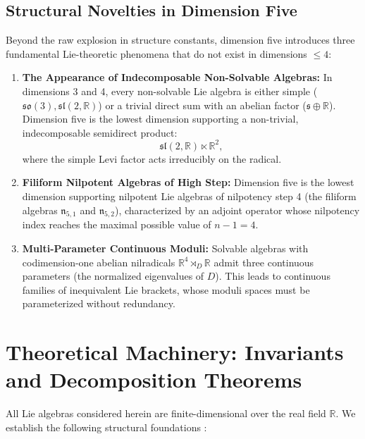 \documentclass[11pt,a4paper]{article}
\theoremstyle{definition}
\theoremstyle{remark}
\newcommand{\R}{\mathbb{R}}
\newcommand{\s}{\mathfrak{s}}
\begin{document}
\subsection{Structural Novelties in Dimension Five}
Beyond the raw explosion in structure constants, dimension five introduces three fundamental Lie-theoretic phenomena that do not exist in dimensions $\le 4$:
\begin{enumerate}
    \item \textbf{The Appearance of Indecomposable Non-Solvable Algebras:} In dimensions 3 and 4, every non-solvable Lie algebra is either simple ($\mathfrak{so}(3), \mathfrak{sl}(2,\R)$) or a trivial direct sum with an abelian factor ($\s \oplus \R$). Dimension five is the lowest dimension supporting a non-trivial, indecomposable semidirect product:
    \begin{equation}
        \mathfrak{sl}(2,\R) \ltimes \R^2,
    \end{equation}
    where the simple Levi factor acts irreducibly on the radical.
    \item \textbf{Filiform Nilpotent Algebras of High Step:} Dimension five is the lowest dimension supporting nilpotent Lie algebras of nilpotency step 4 (the filiform algebras $\mathfrak{n}_{5,1}$ and $\mathfrak{n}_{5,2}$), characterized by an adjoint operator whose nilpotency index reaches the maximal possible value of $n-1 = 4$.
    \item \textbf{Multi-Parameter Continuous Moduli:} Solvable algebras with codimension-one abelian nilradicals $\R^4 \rtimes_D \R$ admit three continuous parameters (the normalized eigenvalues of $D$). This leads to continuous families of inequivalent Lie brackets, whose moduli spaces must be parameterized without redundancy.
\end{enumerate}

\section{Theoretical Machinery: Invariants and Decomposition Theorems}\label{sec:machinery}

All Lie algebras considered herein are finite-dimensional over the real field $\R$. We establish the following structural foundations \citep{JacobsonLieAlgebras, HumphreysIntro, KnappLieGroups}:
\end{document}
